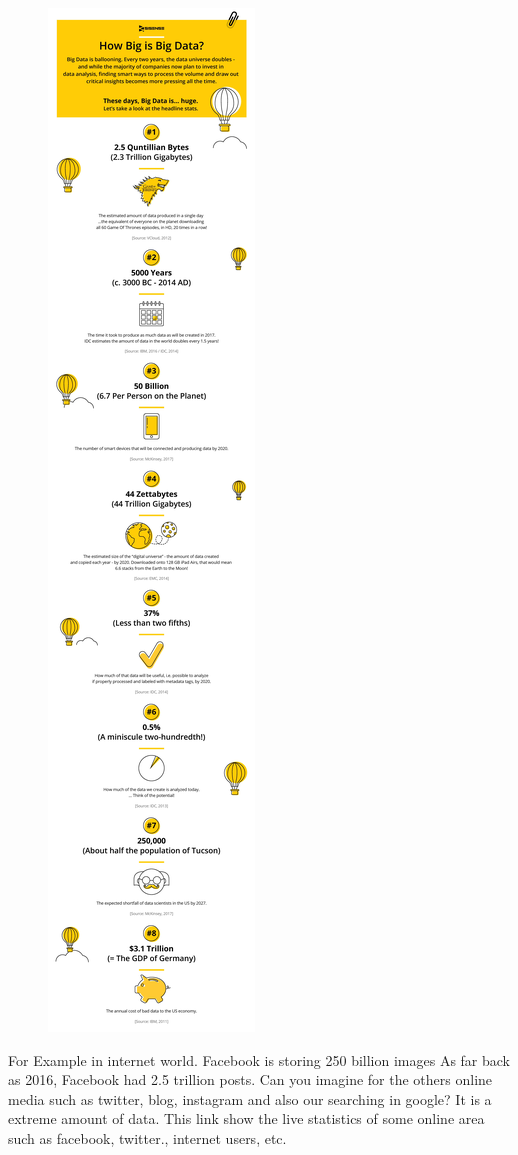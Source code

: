 \documentclass[]{book}
\begin{document}
\begin{figure}
\centering
\includegraphics{8.jpg}
\caption{}
\end{figure}

For Example in internet world. Facebook is storing 250 billion images As
far back as 2016, Facebook had 2.5 trillion posts. Can you imagine for
the others online media such as twitter, blog, instagram and also our
searching in google? It is a extreme amount of data. This link show the
live statistics of some online area such as facebook, twitter., internet
users, etc.
\end{document}
